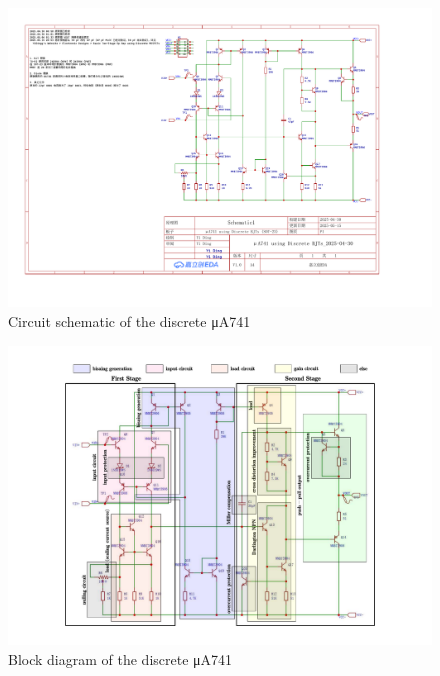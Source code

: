 \documentclass[UTF8]{article}
\begin{document}
\begin{figure}[H]\centering
    \includegraphics[width=0.78\columnwidth]{assets/uA741/SCH_Schematic1_1-P1_2025-05-15.pdf}
    \caption{Circuit schematic of the discrete μA741}
\end{figure}
\begin{figure}[H]\centering
    \includegraphics[width=0.78\columnwidth]{assets/uA741/uA741 block.pdf}
    \caption{Block diagram of the discrete μA741}
\end{figure}
\end{document}
